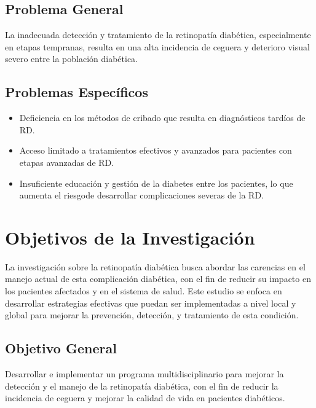 \subsection{Problema General}
\newcommand{\ProblemaGeneral}{
	La inadecuada detección y tratamiento de la retinopatía diabética, especialmente en etapas tempranas, resulta en una alta incidencia de ceguera y deterioro visual severo entre la población diabética.
}
\ProblemaGeneral
\subsection{Problemas Espec\'{i}ficos}
\newcommand{\Pbone}{
	Deficiencia en los métodos de cribado que resulta en diagnósticos tardíos de RD.
}
\newcommand{\Pbtwo}{
	Acceso limitado a tratamientos efectivos y avanzados para pacientes con etapas avanzadas de RD.
}
\newcommand{\Pbthree}{
	Insuficiente educación y gestión de la diabetes entre los pacientes, lo que aumenta el riesgode desarrollar complicaciones severas de la RD.
}
\newcommand{\Pbfour}{
	W
}
\newcommand{\Pbfive}{
	ES
}

\begin{itemize}
	\item \Pbone
	\item \Pbtwo
	\item \Pbthree
\end{itemize}

\section{Objetivos de la Investigación}

La investigación sobre la retinopatía diabética busca abordar las carencias en el manejo actual de esta complicación diabética, con el fin de reducir su impacto en los pacientes afectados y en el sistema de salud. Este estudio se enfoca en desarrollar estrategias efectivas que puedan ser implementadas a nivel local y global para mejorar la prevención, detección, y tratamiento de esta condición.

\subsection{Objetivo General}
\newcommand{\ObjetivoGeneral}{
	Desarrollar e implementar un programa multidisciplinario para mejorar la detección y el manejo de la retinopatía diabética, con el fin de reducir la incidencia de ceguera y mejorar la calidad de vida en pacientes diabéticos.
}
\ObjetivoGeneral
